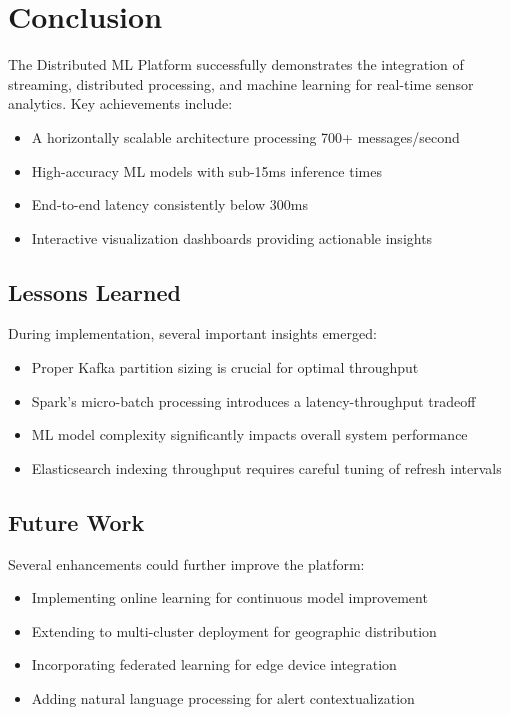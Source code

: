 \documentclass[11pt, a4paper]{article}
\begin{document}
\clearpage
\section{Conclusion}
The Distributed ML Platform successfully demonstrates the integration of streaming, distributed processing, and machine learning for real-time sensor analytics. Key achievements include:

\begin{itemize}[leftmargin=*]
  \item A horizontally scalable architecture processing 700+ messages/second
  \item High-accuracy ML models with sub-15ms inference times
  \item End-to-end latency consistently below 300ms
  \item Interactive visualization dashboards providing actionable insights
\end{itemize}

\subsection{Lessons Learned}
During implementation, several important insights emerged:
\begin{itemize}[leftmargin=*]
  \item Proper Kafka partition sizing is crucial for optimal throughput
  \item Spark's micro-batch processing introduces a latency-throughput tradeoff
  \item ML model complexity significantly impacts overall system performance
  \item Elasticsearch indexing throughput requires careful tuning of refresh intervals
\end{itemize}

\subsection{Future Work}
Several enhancements could further improve the platform:
\begin{itemize}[leftmargin=*]
  \item Implementing online learning for continuous model improvement
  \item Extending to multi-cluster deployment for geographic distribution
  \item Incorporating federated learning for edge device integration
  \item Adding natural language processing for alert contextualization
\end{itemize}
\end{document}
